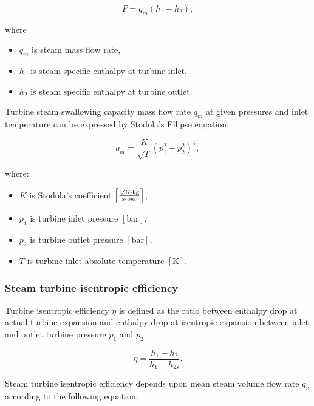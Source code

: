 \documentclass{article}
\begin{document}
	\begin{equation}\label{eq:power}
		P = q_m(h_1 - h_2),
	\end{equation}
	
	\noindent
	where 
	
	\begin{itemize}
		\item $q_m$ is steam mass flow rate, 
		\item $h_1$ is steam specific enthalpy at turbine inlet,
		\item $h_2$ is steam specific enthalpy at turbine outlet.
	\end{itemize}

	Turbine steam swallowing capacity mass flow rate $q_m$ at given pressures and inlet temperature can be expressed by Stodola’s Ellipse equation:
	
	\begin{equation}\label{eq:stodola}
		q_m = \frac{K}{\sqrt{T}}(p_1^2 - p_2^2)^\frac{1}{2},
	\end{equation}
	
	\noindent
	where:
	
	\begin{itemize}
		\item $K$ is Stodola’s coefficient $\left[\frac{\sqrt{\textrm{K}}\cdot 
		\textrm{kg}}{\textrm{s} \cdot \textrm{\textrm{bar}}}\right]$, 
		\item $p_1$ is turbine inlet pressure $\left[\textrm{bar}\right]$,
		\item $p_2$ is turbine outlet pressure $\left[\textrm{bar}\right]$,
		\item $T$ is turbine inlet absolute temperature 
		$\left[\textrm{K}\right]$.
	\end{itemize}
	
	\subsubsection*{Steam turbine isentropic efficiency}
	
	Turbine isentropic efficiency $\eta$ is defined as the ratio between enthalpy drop at actual turbine expansion and enthalpy drop at isentropic expansion between inlet and outlet turbine pressure $p_1$ and $p_2$.
	
	\begin{equation}\label{eq:eta}
		\eta = \frac{h_1-h_2}{h_1 - h_{2s}}.
	\end{equation}
	
	Steam turbine isentropic efficiency depends upon mean steam volume flow 
	rate $q_v$ according to the following equation:
	
\end{document}
